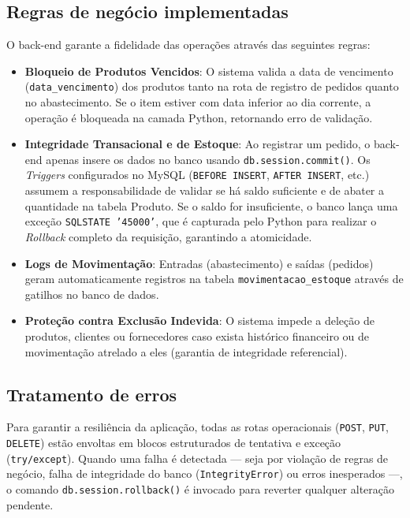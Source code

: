 \subsection{Regras de negócio implementadas}

O back-end garante a fidelidade das operações através das seguintes regras:

\begin{itemize}
    \item \textbf{Bloqueio de Produtos Vencidos}: O sistema valida a data de vencimento (\texttt{data\_vencimento}) dos produtos tanto na rota de registro de pedidos quanto no abastecimento. Se o item estiver com data inferior ao dia corrente, a operação é bloqueada na camada Python, retornando erro de validação.

    \item \textbf{Integridade Transacional e de Estoque}: Ao registrar um pedido, o back-end apenas insere os dados no banco usando \texttt{db.session.commit()}. Os \textit{Triggers} configurados no MySQL (\texttt{BEFORE INSERT}, \texttt{AFTER INSERT}, etc.) assumem a responsabilidade de validar se há saldo suficiente e de abater a quantidade na tabela Produto. Se o saldo for insuficiente, o banco lança uma exceção \texttt{SQLSTATE '45000'}, que é capturada pelo Python para realizar o \textit{Rollback} completo da requisição, garantindo a atomicidade.

    \item \textbf{Logs de Movimentação}: Entradas (abastecimento) e saídas (pedidos) geram automaticamente registros na tabela \texttt{movimentacao\_estoque} através de gatilhos no banco de dados.

    \item \textbf{Proteção contra Exclusão Indevida}: O sistema impede a deleção de produtos, clientes ou fornecedores caso exista histórico financeiro ou de movimentação atrelado a eles (garantia de integridade referencial).
\end{itemize}

\subsection{Tratamento de erros}

Para garantir a resiliência da aplicação, todas as rotas operacionais (\texttt{POST}, \texttt{PUT}, \texttt{DELETE}) estão envoltas em blocos estruturados de tentativa e exceção (\texttt{try/except}). Quando uma falha é detectada --- seja por violação de regras de negócio, falha de integridade do banco (\texttt{IntegrityError}) ou erros inesperados ---, o comando \texttt{db.session.rollback()} é invocado para reverter qualquer alteração pendente.

